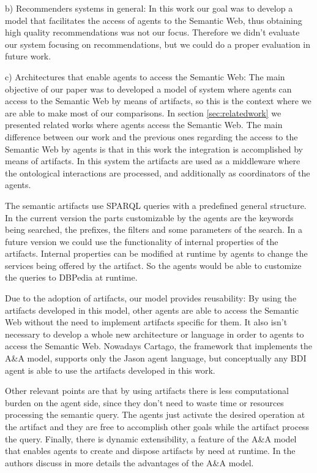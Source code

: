 \documentclass[a4paper,twoside]{article}
\begin{document}
b) Recommenders systems in general: In this work our goal was to develop a model that facilitates the access of agents to the Semantic Web, thus obtaining high quality recommendations was not our focus. Therefore we didn't evaluate our system focusing on recommendations, but we could do a proper evaluation in future work.

c) Architectures that enable agents to access the Semantic Web: The main objective of our paper was to developed a model of system where agents can access to the Semantic Web by means of artifacts, so this is the context where we are able to make most of our comparisons. In section \ref{sec:relatedwork} we presented related works where agents access the Semantic Web. The main difference between our work and the previous ones regarding the access to the Semantic Web by agents is that in this work the integration is accomplished by means of artifacts. In this system the artifacts are used as a middleware where the ontological interactions are processed, and additionally as coordinators of the agents.

The semantic artifacts use SPARQL queries with a predefined general structure. In the current version the parts customizable by the agents are the keywords being searched, the prefixes, the filters and some parameters of the search. In a future version we could use the functionality of internal properties of the artifacts. Internal properties can be modified at runtime by agents to change the services being offered by the artifact. So the agents would be able to customize the queries to DBPedia at runtime.

Due to the adoption of artifacts, our model provides reusability: By using the artifacts developed in this model, other agents are able to access the Semantic Web without the need to implement artifacts specific for them. It also isn't necessary to develop a whole new architecture or language in order to agents to access the Semantic Web. Nowadays Cartago, the framework that implements the A\&A model, supports only the Jason agent language, but conceptually any BDI agent is able to use the artifacts developed in this work.

Other relevant points are that by using artifacts there is less computational burden on the agent side, since they don't need to waste time or resources processing the semantic query. The agents just activate the desired operation at the artifact and they are free to accomplish other goals while the artifact process the query. Finally, there is dynamic extensibility, a feature of the A\&A model that enables agents to create and dispose artifacts by need at runtime. In \cite{ref5} the authors discuss in more details the advantages of the A\&A model.
\end{document}
